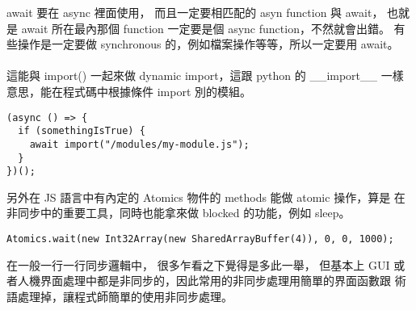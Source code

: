   await 要在 async 裡面使用， 而且一定要相匹配的 asyn function 與 await，
  也就是 await 所在最內那個 function 一定要是個 async function，不然就會出錯。
  有些操作是一定要做 synchronous 的，例如檔案操作等等，所以一定要用 await。
  \\\\
  這能與 import() 一起來做 dynamic import，這跟 python 的 \_\_import\_\_
  一樣意思，能在程式碼中根據條件 import 別的模組。
  \begin{verbatim}
(async () => {
  if (somethingIsTrue) {
    await import("/modules/my-module.js");
  }
})();
  \end{verbatim}
  另外在 JS 語言中有內定的 Atomics 物件的 methods 能做 atomic 操作，算是
  在非同步中的重要工具，同時也能拿來做 blocked 的功能，例如 sleep。
  \begin{verbatim}
Atomics.wait(new Int32Array(new SharedArrayBuffer(4)), 0, 0, 1000);
  \end{verbatim}
  在一般一行一行同步邏輯中， 很多乍看之下覺得是多此一舉， 但基本上 GUI
  或者人機界面處理中都是非同步的，因此常用的非同步處理用簡單的界面函數跟
  術語處理掉，讓程式師簡單的使用非同步處理。

